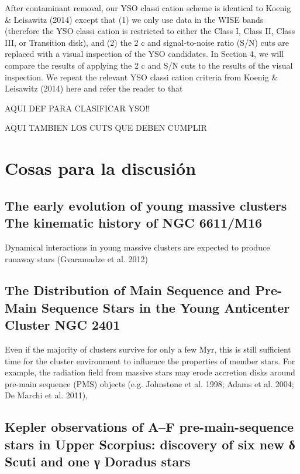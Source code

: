 \documentclass[../Main.tex]{subfiles}
\begin{document}
{After contaminant removal, our YSO classi cation scheme is
identical to Koenig & Leisawitz (2014) except that (1) we only
use data in the WISE bands (therefore the YSO classi cation is
restricted to either the Class I, Class II, Class III, or Transition
disk), and (2) the 2
c and signal-to-noise ratio (S/N) cuts are
replaced with a visual inspection of the YSO candidates. In
Section 4, we will compare the results of applying the 2
c and
S/N cuts to the results of the visual inspection.
We repeat the relevant YSO classi cation criteria from
Koenig & Leisawitz (2014) here and refer the reader to that

AQUI DEF PARA CLASIFICAR YSO!!

AQUI TAMBIEN LOS CUTS QUE DEBEN CUMPLIR

\section{Cosas para la discusión}
\subsection{The early evolution of young massive clusters
The kinematic history of NGC 6611/M16}
Dynamical interactions in
young massive clusters are expected to produce runaway stars
(Gvaramadze et al. 2012)

\subsection{The Distribution of Main Sequence and Pre-Main Sequence Stars
in the Young Anticenter Cluster NGC 2401}

Even if the majority of clusters survive for only a few Myr, this is still suﬃcient time
for the cluster environment to influence the properties of member stars. For example, the
radiation field from massive stars may erode accretion disks around pre-main sequence (PMS)
objects (e.g. Johnstone et al. 1998; Adams et al. 2004; De Marchi et al. 2011),

\subsection{Kepler observations of A–F pre-main-sequence stars in Upper Scorpius:
discovery of six new δ Scuti and one γ Doradus stars}

}
\end{document}

